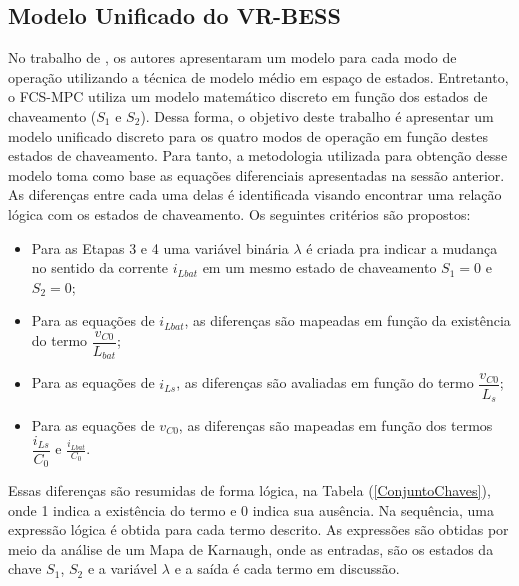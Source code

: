 \subsection{Modelo Unificado do VR-BESS} 

No trabalho de \cite{marcello22019modelagem}, os autores apresentaram um modelo para cada modo de operação utilizando a técnica de modelo médio em espaço de estados. Entretanto, o FCS-MPC utiliza um modelo matemático discreto em função dos estados de chaveamento ($S_1$ e $S_2$). Dessa forma, o objetivo deste trabalho é apresentar um modelo unificado discreto para os quatro modos de operação em função destes estados de chaveamento. Para tanto, a metodologia utilizada para obtenção desse modelo toma como base as equações diferenciais apresentadas na sessão anterior. As diferenças entre cada uma delas é identificada visando encontrar uma relação lógica com os estados de chaveamento. Os seguintes critérios são propostos: 

\begin{itemize}
    \item Para as Etapas 3 e 4 uma variável binária  $\lambda$ é criada pra indicar a mudança no sentido da corrente $i_{Lbat}$ em um mesmo estado de chaveamento $S_1=0$ e $S_2=0$; 
    \item Para as equações de $i_{Lbat}$, as diferenças são mapeadas em função da existência do termo $\dfrac{v_{C0}}{L_{bat}}$; 
    \item Para as equações de $i_{Ls}$, as diferenças são avaliadas em função do termo $\dfrac{v_{C0}}{L_{s}}$;
    \item Para as equações de $v_{C0}$, as diferenças são mapeadas em função dos termos $\dfrac{i_{Ls}}{C_0}$ e $\frac{i_{Lbat}}{C_0}$.
\end{itemize}

Essas diferenças são resumidas de forma lógica, na Tabela (\ref{ConjuntoChaves}), onde 1 indica a existência do termo e 0 indica sua ausência. Na sequência, uma expressão lógica é obtida  para cada termo descrito. As expressões são obtidas por meio da análise de um Mapa de Karnaugh, onde as entradas, são os estados da chave $S_1$, $S_2$ e a variável $\lambda$ e a saída é cada termo em discussão. 



